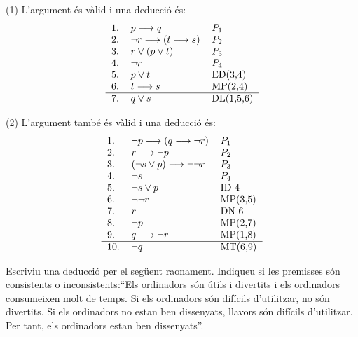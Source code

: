 \begin{solucio}
(1) L'argument és vàlid i una deducció és:
\[%
\begin{tabular}
[c]{lll}%
1. & $p\longrightarrow q$ & $P_{1}$\\
2. & $\lnot r\longrightarrow\left(  t\longrightarrow s\right)  $ & $P_{2}$\\
3. & $r\vee\left(  p\vee t\right)  $ & $P_{3}$\\
4. & $\lnot r$ & $P_{4}$\\
5. & $p\vee t$ & ED(3,4)\\
6. & $t\longrightarrow s$ & MP(2,4)\\\hline
7. & $q\vee s$ & DL(1,5,6)
\end{tabular}
\]


(2) L'argument també és vàlid i una deducció és:%
\[%
\begin{tabular}
[c]{lll}%
1. & $\lnot p\longrightarrow\left(  q\longrightarrow\lnot r\right)  $ &
$P_{1}$\\
2. & $r\longrightarrow\lnot p$ & $P_{2}$\\
3. & $\left(  \lnot s\vee p\right)  \longrightarrow\lnot\lnot r$ & $P_{3}$\\
4. & $\lnot s$ & $P_{4}$\\
5. & $\lnot s\vee p$ & ID 4\\
6. & $\lnot\lnot r$ & MP(3,5)\\
7. & $r$ & DN 6\\
8. & $\lnot p$ & MP(2,7)\\
9. & $q\longrightarrow\lnot r$ & MP(1,8)\\\hline
10. & $\lnot q$ & MT(6,9)
\end{tabular}
\]

\end{solucio}

\begin{exercici}
Escriviu una deducció per el següent raonament. Indiqueu si les
premisses són consistents o inconsistents:\enquote{Els ordinadors
són útils i divertits i els ordinadors consumeixen molt de temps. Si
els ordinadors són difícils d'utilitzar, no són divertits. Si els
ordinadors no estan ben dissenyats, llavors són difícils d'utilitzar.
Per tant, els ordinadors estan ben dissenyats}.
\end{exercici}

